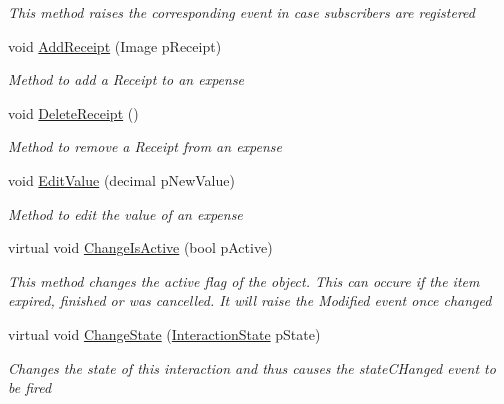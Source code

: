 \begin{DoxyCompactItemize}
\begin{DoxyCompactList}\small\item\em This method raises the corresponding event in case subscribers are registered \end{DoxyCompactList}\item 
void \hyperlink{class_plex_byte_1_1_mo_cap_1_1_interactions_1_1_expense_a33e21b15e70fa450463a5a5197dcfe38}{Add\+Receipt} (Image p\+Receipt)
\begin{DoxyCompactList}\small\item\em Method to add a Receipt to an expense \end{DoxyCompactList}\item 
void \hyperlink{class_plex_byte_1_1_mo_cap_1_1_interactions_1_1_expense_a927ad9089c43c09790083d554b1139f8}{Delete\+Receipt} ()
\begin{DoxyCompactList}\small\item\em Method to remove a Receipt from an expense \end{DoxyCompactList}\item 
void \hyperlink{class_plex_byte_1_1_mo_cap_1_1_interactions_1_1_expense_ace1f3d1404f02fb78583b1709641c2c1}{Edit\+Value} (decimal p\+New\+Value)
\begin{DoxyCompactList}\small\item\em Method to edit the value of an expense \end{DoxyCompactList}\item 
virtual void \hyperlink{class_plex_byte_1_1_mo_cap_1_1_interactions_1_1_expense_a37a7af04bd991bfbfd8619ee3bd35d6c}{Change\+Is\+Active} (bool p\+Active)
\begin{DoxyCompactList}\small\item\em This method changes the active flag of the object. This can occure if the item expired, finished or was cancelled. It will raise the Modified event once changed \end{DoxyCompactList}\item 
virtual void \hyperlink{class_plex_byte_1_1_mo_cap_1_1_interactions_1_1_expense_adae1f2089f4eeb5cfedebc1af1f06b38}{Change\+State} (\hyperlink{namespace_plex_byte_1_1_mo_cap_1_1_interactions_afcb673d9186608b6bd3b187179aedc8a}{Interaction\+State} p\+State)
\begin{DoxyCompactList}\small\item\em Changes the state of this interaction and thus causes the state\+C\+Hanged event to be fired \end{DoxyCompactList}\end{DoxyCompactItemize}
